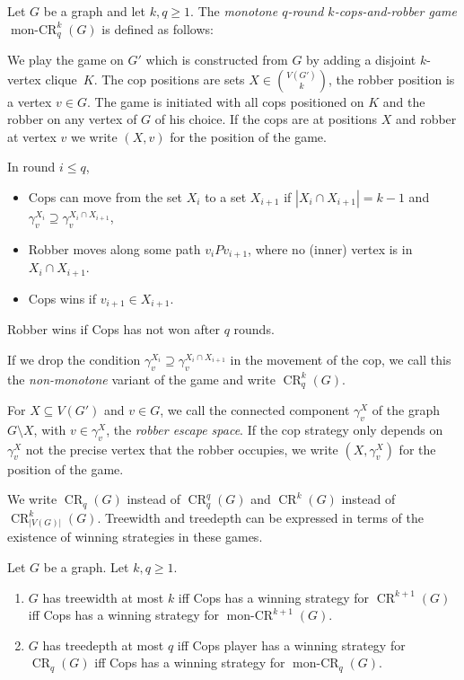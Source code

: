\documentclass[a4paper,UKenglish,cleveref, autoref, thm-restate]{lipics-v2021}
\DeclareMathOperator{\CR}{CR}
\DeclareMathOperator{\monCR}{mon-CR}
\begin{document}
\begin{definition}
	\label{def:Ekq-cops}
	Let $G$ be a graph and let $k,q\geq 1$.
	The \emph{monotone $q$-round $k$-cops-and-robber game} $\monCR_q^{k}(G)$ is defined as follows:
	
	We play the game on $G'$ which is constructed from $G$ by adding a disjoint $k$-vertex clique~$K$.
	The cop positions are sets $X\in \binom{V(G')}k$, the robber position is a vertex $v\in G$.
	The game is initiated with all cops positioned on $K$ and the robber on any vertex of $G$ of his choice.
	If the cops are at positions $X$ and robber at vertex $v$ we write $(X,v)$ for the position of the game.
	
	In round $i\leq q$, 
	\begin{itemize}
		\item Cops can move from the set $X_i$ to a set $X_{i+1}$ if $|X_i\cap X_{i+1}|=k-1$ and $\gamma_{v}^{X_{i}}\supseteq \gamma_{v}^{X_i\cap X_{i+1}}$,
		\item Robber moves along some path $v_iPv_{i+1}$, where no (inner) vertex is in $X_i\cap X_{i+1}$.
		\item Cops wins if $v_{i+1}\in X_{i+1}$.
	\end{itemize}
	Robber wins if Cops has not won after $q$ rounds.
	
	If we drop the condition $\gamma_{v}^{X_{i}}\supseteq \gamma_{v}^{X_i\cap X_{i+1}}$ in the movement of the cop, we call this the \emph{non-monotone} variant of the game and write $\CR_q^{k}(G)$.
\end{definition}

For $X\subseteq V(G')$ and $v\in G$, we call the connected component $\gamma^X_v$ of the graph $G\setminus X$, with $v\in \gamma^X_v$, the \emph{robber escape space}.
If the cop strategy only depends on $\gamma^X_v$ not the precise vertex that the robber occupies, we write $(X,\gamma^X_v)$ for the position of the game.

We write $\CR_q(G)$ instead of $\CR_q^q(G)$ and $\CR^k(G)$ instead of $\CR_{|V(G)|}^k(G)$.
Treewidth and treedepth can be expressed in terms of the existence of winning strategies in these games.



\begin{lemma} \label{lem:games}
  Let $G$ be a graph. Let $k,q \geq 1$.
  \begin{enumerate}
  \item $G$ has treewidth at most $k$ iff Cops has a winning strategy for $\CR^{k+1}(G)$ iff Cops has a winning strategy for $\monCR^{k+1}(G)$.
  \item $G$ has treedepth at most $q$ iff Cops player has a winning strategy for $\CR_q(G)$ iff Cops has a winning strategy for $\monCR_q(G)$.
  \end{enumerate}
\end{lemma}
\end{document}
